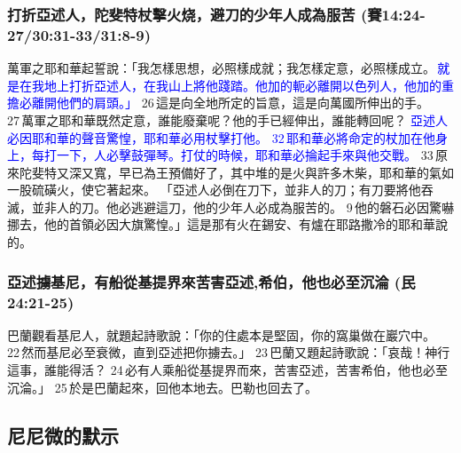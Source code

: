 \subsubsection{打折亞述人，陀斐特杖擊火烧，避刀的少年人成為服苦 (賽14:24-27/30:31-33/31:8-9)}
萬軍之耶和華起誓說：「我怎樣思想，必照樣成就；我怎樣定意，必照樣成立。\textcolor{blue}{ 就是在我地上打折亞述人，在我山上將他踐踏。他加的軛必離開以色列人，他加的重擔必離開他們的肩頭。」} 26 這是向全地所定的旨意，這是向萬國所伸出的手。 27 萬軍之耶和華既然定意，誰能廢棄呢？他的手已經伸出，誰能轉回呢？
\textcolor{blue}{亞述人必因耶和華的聲音驚惶，耶和華必用杖擊打他。 32 耶和華必將命定的杖加在他身上，每打一下，人必擊鼓彈琴。打仗的時候，耶和華必掄起手來與他交戰。} 33 原來陀斐特又深又寬，早已為王預備好了，其中堆的是火與許多木柴，耶和華的氣如一股硫磺火，使它著起來。
「亞述人必倒在刀下，並非人的刀；有刀要將他吞滅，並非人的刀。他必逃避這刀，他的少年人必成為服苦的。 9 他的磐石必因驚嚇挪去，他的首領必因大旗驚惶。」這是那有火在錫安、有爐在耶路撒冷的耶和華說的。

\subsubsection{亞述擄基尼，有船從基提界來苦害亞述,希伯，他也必至沉淪 (民24:21-25)}
巴蘭觀看基尼人，就題起詩歌說：「你的住處本是堅固，你的窩巢做在巖穴中。 22 然而基尼必至衰微，直到亞述把你擄去。」 23 巴蘭又題起詩歌說：「哀哉！神行這事，誰能得活？ 24 必有人乘船從基提界而來，苦害亞述，苦害希伯，他也必至沉淪。」 25 於是巴蘭起來，回他本地去。巴勒也回去了。











\subsection{尼尼微的默示}
